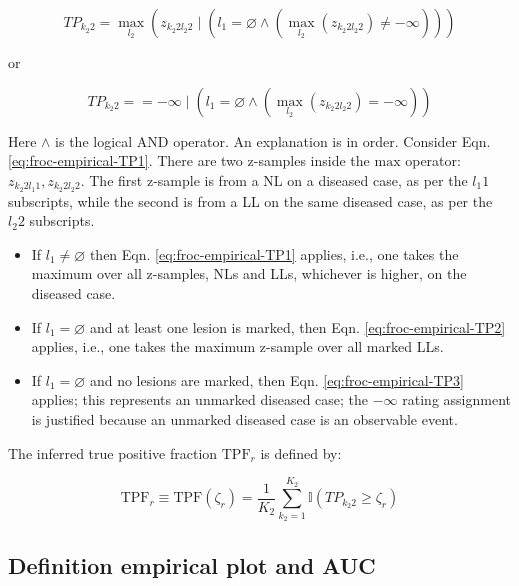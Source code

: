 \documentclass[
]{book}
\begin{document}
\begin{equation}
TP_{k_2 2} = \textstyle\max_{l_2}  \left ( z_{k_2 2 l_2 2} \mid\left ( l_1 = \varnothing \land \left (\textstyle\max_{l_2}{\left (z_{k_2 2 l_2 2}  \right )} \neq -\infty  \right )  \right ) \right ) 
\label{eq:froc-empirical-TP2}
\end{equation}

or

\begin{equation}
TP_{k_2 2} = = -\infty \mid \left ( l_1 = \varnothing \land\left ( \textstyle\max_{l_2}{\left (z_{k_2 2 l_2 2}  \right )} = -\infty  \right )  \right )
\label{eq:froc-empirical-TP3}
\end{equation}

Here \(\land\) is the logical AND operator. An explanation is in order. Consider Eqn. \eqref{eq:froc-empirical-TP1}. There are two z-samples inside the \(\text{max}\) operator: \(z_{k_2 2 l_1 1} ,z_{k_2 2 l_2 2}\). The first z-sample is from a NL on a diseased case, as per the \(l_1 1\) subscripts, while the second is from a LL on the same diseased case, as per the \(l_2 2\) subscripts.

\begin{itemize}
\item
  If \(l_1 \neq \varnothing\) then Eqn. \eqref{eq:froc-empirical-TP1} applies, i.e., one takes the maximum over all z-samples, NLs and LLs, whichever is higher, on the diseased case.
\item
  If \(l_1 = \varnothing\) and at least one lesion is marked, then Eqn. \eqref{eq:froc-empirical-TP2} applies, i.e., one takes the maximum z-sample over all marked LLs.
\item
  If \(l_1 = \varnothing\) and no lesions are marked, then Eqn. \eqref{eq:froc-empirical-TP3} applies; this represents an unmarked diseased case; the \(-\infty\) rating assignment is justified because an unmarked diseased case is an observable event.
\end{itemize}

The inferred true positive fraction \(\text{TPF}_r\) is defined by:

\begin{equation}
\text{TPF}_r \equiv \text{TPF}(\zeta_r) = \frac{1}{K_2}\sum_{k_2=1}^{K_2} \mathbb{I}\left ( TP_{k_2 2} \geq \zeta_r \right )
\label{eq:froc-empirical-TPF}
\end{equation}

\hypertarget{froc-empirical-definition-empirical-auc-roc}{%
\subsection{Definition empirical plot and AUC}\label{froc-empirical-definition-empirical-auc-roc}}
\end{document}
